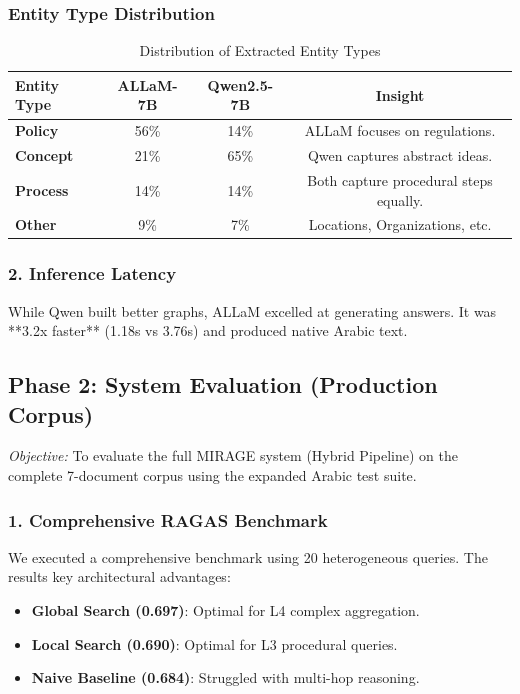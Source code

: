 \documentclass[11pt, onecolumn]{article}
\begin{document}
\subsubsection{Entity Type Distribution}
\begin{table}[H]
    \centering
    \begin{tabular}{lccc}
        \toprule
        \textbf{Entity Type} & \textbf{ALLaM-7B} & \textbf{Qwen2.5-7B} & \textbf{Insight} \\
        \midrule
        \textbf{Policy} & 56\% & 14\% & ALLaM focuses on regulations. \\
        \textbf{Concept} & 21\% & 65\% & Qwen captures abstract ideas. \\
        \textbf{Process} & 14\% & 14\% & Both capture procedural steps equally. \\
        \textbf{Other} & 9\% & 7\% & Locations, Organizations, etc. \\
        \bottomrule
    \end{tabular}
    \caption{Distribution of Extracted Entity Types}
\end{table}

\subsubsection{2. Inference Latency}
While Qwen built better graphs, ALLaM excelled at generating answers. It was **3.2x faster** (1.18s vs 3.76s) and produced native Arabic text.

\subsection{Phase 2: System Evaluation (Production Corpus)}
\textit{Objective:} To evaluate the full MIRAGE system (Hybrid Pipeline) on the complete 7-document corpus using the expanded Arabic test suite.

\subsubsection{1. Comprehensive RAGAS Benchmark}
We executed a comprehensive benchmark using 20 heterogeneous queries. The results key architectural advantages:
\begin{itemize}
    \item \textbf{Global Search (0.697)}: Optimal for L4 complex aggregation.
    \item \textbf{Local Search (0.690)}: Optimal for L3 procedural queries.
    \item \textbf{Naive Baseline (0.684)}: Struggled with multi-hop reasoning.
\end{itemize}
\end{document}
